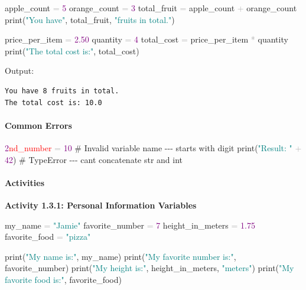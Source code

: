 \documentclass[
  justified,
  openright,
]{tufte-book}
\let\subsubsection\paragraph
\let\paragraph\paragraph
\newcommand{\BuiltInTok}[1]{#1}
\newcommand{\CommentTok}[1]{\textcolor{MidGray}{#1}}
\newcommand{\DecValTok}[1]{\textcolor{Purple}{#1}}
\newcommand{\ErrorTok}[1]{\textcolor{Red}{#1}}
\newcommand{\FloatTok}[1]{\textcolor{Purple}{#1}}
\newcommand{\NormalTok}[1]{#1}
\newcommand{\OperatorTok}[1]{\textcolor{DarkGray}{#1}}
\newcommand{\StringTok}[1]{\textcolor{Teal}{#1}}
\newenvironment{Shaded}{%
  \begin{snugshade}
}{%
  \end{snugshade}
}
\let\subsubsection\paragraph
\let\paragraph\paragraph
\begin{document}
\begin{Shaded}
\begin{Highlighting}[]
\NormalTok{apple\_count }\OperatorTok{=} \DecValTok{5}
\NormalTok{orange\_count }\OperatorTok{=} \DecValTok{3}
\NormalTok{total\_fruit }\OperatorTok{=}\NormalTok{ apple\_count }\OperatorTok{+}\NormalTok{ orange\_count}
\BuiltInTok{print}\NormalTok{(}\StringTok{"You have"}\NormalTok{, total\_fruit, }\StringTok{"fruits in total."}\NormalTok{)}

\NormalTok{price\_per\_item }\OperatorTok{=} \FloatTok{2.50}
\NormalTok{quantity }\OperatorTok{=} \DecValTok{4}
\NormalTok{total\_cost }\OperatorTok{=}\NormalTok{ price\_per\_item }\OperatorTok{*}\NormalTok{ quantity}
\BuiltInTok{print}\NormalTok{(}\StringTok{"The total cost is:"}\NormalTok{, total\_cost)}
\end{Highlighting}
\end{Shaded}

Output:

\begin{verbatim}
You have 8 fruits in total.
The total cost is: 10.0
\end{verbatim}

\subsubsection{Common Errors}\label{common-errors}

\begin{Shaded}
\begin{Highlighting}[]
\DecValTok{2}\ErrorTok{nd\_number} \OperatorTok{=} \DecValTok{10}         \CommentTok{\# Invalid variable name {-}{-}{-} starts with digit}
\BuiltInTok{print}\NormalTok{(}\StringTok{"Result: "} \OperatorTok{+} \DecValTok{42}\NormalTok{)  }\CommentTok{\# TypeError {-}{-}{-} can\textquotesingle{}t concatenate str and int}
\end{Highlighting}
\end{Shaded}

\subsubsection{Activities}\label{activities-2}

\textbf{Activity 1.3.1: Personal Information Variables}

\begin{Shaded}
\begin{Highlighting}[]
\NormalTok{my\_name }\OperatorTok{=} \StringTok{"Jamie"}
\NormalTok{favorite\_number }\OperatorTok{=} \DecValTok{7}
\NormalTok{height\_in\_meters }\OperatorTok{=} \FloatTok{1.75}
\NormalTok{favorite\_food }\OperatorTok{=} \StringTok{"pizza"}

\BuiltInTok{print}\NormalTok{(}\StringTok{"My name is:"}\NormalTok{, my\_name)}
\BuiltInTok{print}\NormalTok{(}\StringTok{"My favorite number is:"}\NormalTok{, favorite\_number)}
\BuiltInTok{print}\NormalTok{(}\StringTok{"My height is:"}\NormalTok{, height\_in\_meters, }\StringTok{"meters"}\NormalTok{)}
\BuiltInTok{print}\NormalTok{(}\StringTok{"My favorite food is:"}\NormalTok{, favorite\_food)}
\end{Highlighting}
\end{Shaded}
\end{document}
